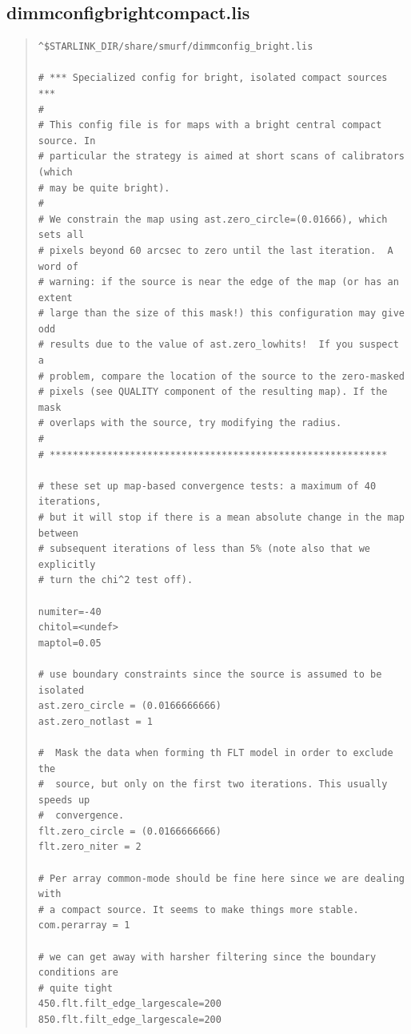 \documentclass[twoside,11pt]{article}
\renewcommand{\_}{\texttt{\symbol{95}}}
\newenvironment{myquote}{\begin{quote}\begin{small}}{\end{small}\end{quote}}
\begin{document}
\subsection{dimmconfig\_bright\_compact.lis}
\begin{myquote}
\begin{verbatim}
^$STARLINK_DIR/share/smurf/dimmconfig_bright.lis

# *** Specialized config for bright, isolated compact sources ***
#
# This config file is for maps with a bright central compact source. In
# particular the strategy is aimed at short scans of calibrators (which
# may be quite bright).
#
# We constrain the map using ast.zero_circle=(0.01666), which sets all
# pixels beyond 60 arcsec to zero until the last iteration.  A word of
# warning: if the source is near the edge of the map (or has an extent
# large than the size of this mask!) this configuration may give odd
# results due to the value of ast.zero_lowhits!  If you suspect a
# problem, compare the location of the source to the zero-masked
# pixels (see QUALITY component of the resulting map). If the mask
# overlaps with the source, try modifying the radius.
#
# ***********************************************************

# these set up map-based convergence tests: a maximum of 40 iterations,
# but it will stop if there is a mean absolute change in the map between
# subsequent iterations of less than 5% (note also that we explicitly
# turn the chi^2 test off).

numiter=-40
chitol=<undef>
maptol=0.05

# use boundary constraints since the source is assumed to be isolated
ast.zero_circle = (0.0166666666)
ast.zero_notlast = 1

#  Mask the data when forming th FLT model in order to exclude the
#  source, but only on the first two iterations. This usually speeds up
#  convergence.
flt.zero_circle = (0.0166666666)
flt.zero_niter = 2

# Per array common-mode should be fine here since we are dealing with
# a compact source. It seems to make things more stable.
com.perarray = 1

# we can get away with harsher filtering since the boundary conditions are
# quite tight
450.flt.filt_edge_largescale=200
850.flt.filt_edge_largescale=200
\end{verbatim}
\end{myquote}
\end{document}
